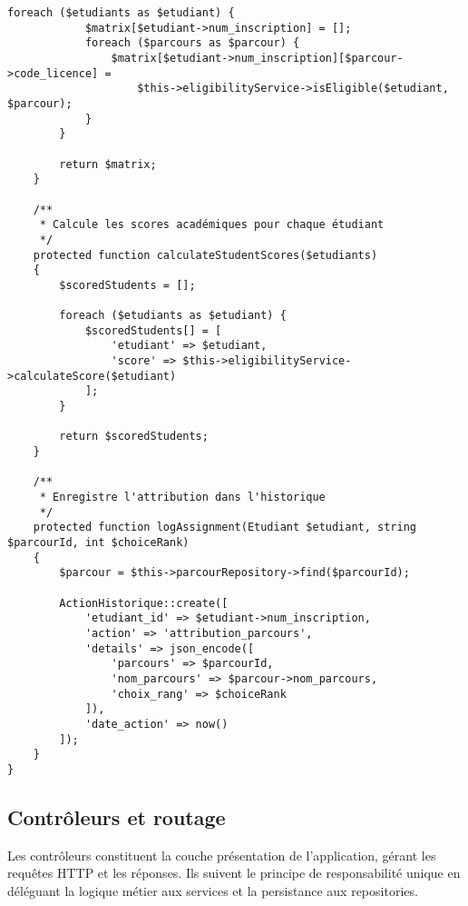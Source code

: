 \documentclass[french,12pt]{report} %
\begin{document}
\begin{lstlisting}[style=phpstyle,caption={AssignmentService - Algorithme d'attribution des parcours}]
        foreach ($etudiants as $etudiant) {
            $matrix[$etudiant->num_inscription] = [];
            foreach ($parcours as $parcour) {
                $matrix[$etudiant->num_inscription][$parcour->code_licence] = 
                    $this->eligibilityService->isEligible($etudiant, $parcour);
            }
        }
        
        return $matrix;
    }
    
    /**
     * Calcule les scores académiques pour chaque étudiant
     */
    protected function calculateStudentScores($etudiants)
    {
        $scoredStudents = [];
        
        foreach ($etudiants as $etudiant) {
            $scoredStudents[] = [
                'etudiant' => $etudiant,
                'score' => $this->eligibilityService->calculateScore($etudiant)
            ];
        }
        
        return $scoredStudents;
    }
    
    /**
     * Enregistre l'attribution dans l'historique
     */
    protected function logAssignment(Etudiant $etudiant, string $parcourId, int $choiceRank)
    {
        $parcour = $this->parcourRepository->find($parcourId);
        
        ActionHistorique::create([
            'etudiant_id' => $etudiant->num_inscription,
            'action' => 'attribution_parcours',
            'details' => json_encode([
                'parcours' => $parcourId,
                'nom_parcours' => $parcour->nom_parcours,
                'choix_rang' => $choiceRank
            ]),
            'date_action' => now()
        ]);
    }
}
\end{lstlisting}

\subsection{Contrôleurs et routage}

Les contrôleurs constituent la couche présentation de l'application, gérant les requêtes HTTP et les réponses. Ils suivent le principe de responsabilité unique en déléguant la logique métier aux services et la persistance aux repositories.
\end{document}
